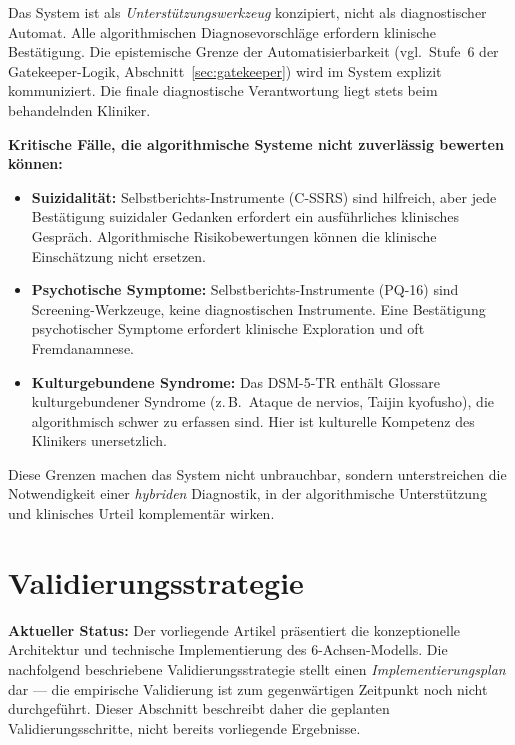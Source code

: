 \documentclass[11pt,a4paper]{article}
\begin{document}
Das System ist als \textit{Unterst\"utzungswerkzeug} konzipiert, nicht als diagnostischer Automat. Alle algorithmischen Diagnosevorschl\"age erfordern klinische Best\"atigung. Die epistemische Grenze der Automatisierbarkeit (vgl.\ Stufe~6 der Gatekeeper-Logik, Abschnitt~\ref{sec:gatekeeper}) wird im System explizit kommuniziert. Die finale diagnostische Verantwortung liegt stets beim behandelnden Kliniker.

\textbf{Kritische F\"alle, die algorithmische Systeme nicht zuverl\"assig bewerten k\"onnen:}
\begin{itemize}[noitemsep]
\item \textbf{Suizidalit\"at:} Selbstberichts-Instrumente (C-SSRS) sind hilfreich, aber jede Best\"atigung suizidaler Gedanken erfordert ein ausf\"uhrliches klinisches Gespr\"ach. Algorithmische Risikobewertungen k\"onnen die klinische Einsch\"atzung nicht ersetzen.
\item \textbf{Psychotische Symptome:} Selbstberichts-Instrumente (PQ-16) sind Screening-Werkzeuge, keine diagnostischen Instrumente. Eine Best\"atigung psychotischer Symptome erfordert klinische Exploration und oft Fremdanamnese.
\item \textbf{Kulturgebundene Syndrome:} Das DSM-5-TR enth\"alt Glossare kulturgebundener Syndrome (z.\,B.\ Ataque de nervios, Taijin kyofusho), die algorithmisch schwer zu erfassen sind. Hier ist kulturelle Kompetenz des Klinikers unersetzlich.
\end{itemize}

Diese Grenzen machen das System nicht unbrauchbar, sondern unterstreichen die Notwendigkeit einer \textit{hybriden} Diagnostik, in der algorithmische Unterst\"utzung und klinisches Urteil komplement\"ar wirken.


\section{Validierungsstrategie}
\label{sec:validierung}

\textbf{Aktueller Status:} Der vorliegende Artikel pr\"asentiert die konzeptionelle Architektur und technische Implementierung des 6-Achsen-Modells. Die nachfolgend beschriebene Validierungsstrategie stellt einen \textit{Implementierungsplan} dar --- die empirische Validierung ist zum gegenw\"artigen Zeitpunkt noch nicht durchgef\"uhrt. Dieser Abschnitt beschreibt daher die geplanten Validierungsschritte, nicht bereits vorliegende Ergebnisse.
\end{document}
